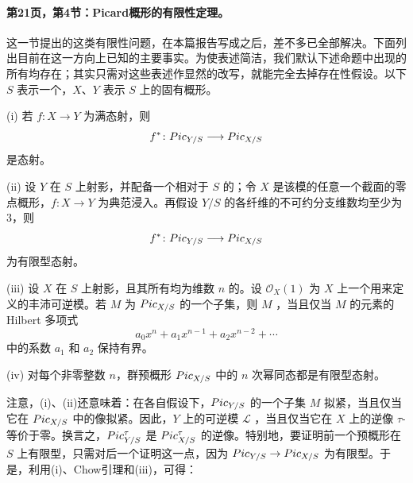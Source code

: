 \paragraph{第21页，第4节：Picard概形的有限性定理。}这一节提出的这类有限性问题，在本篇报告写成之后，差不多已全部解决。下面列出目前在这一方向上已知的主要事实。为使表述简洁，我们默认下述命题中出现的所有均存在；其实只需对这些表述作显然的改写，就能完全去掉存在性假设。以下 $S$ 表示一个，$X$、$Y$ 表示 $S$ 上的固有概形。

\begin{statement}{(i)}
若 $f\colon X\to Y$ 为满态射，则
\[
f^*\colon Pic_{Y/S}\longrightarrow Pic_{X/S}
\]
是态射。
\end{statement}

\begin{statement}{(ii)}
设 $Y$ 在 $S$ 上射影，并配备一个相对于 $S$ 的；令 $X$ 是该模的任意一个截面的零点概形，$f\colon X\to Y$ 为典范浸入。再假设 $Y/S$ 的各纤维的不可约分支维数均至少为 $3$，则
\[
f^*\colon Pic_{Y/S}\longrightarrow Pic_{X/S}
\]
为有限型态射。
\end{statement}

\begin{statement}{(iii)}
设 $X$ 在 $S$ 上射影，且其所有均为维数 $n$ 的。设 $\mathcal O_X(1)$ 为 $X$ 上一个用来定义的丰沛可逆模。若 $M$ 为 $Pic_{X/S}$ 的一个子集，则 $M$ ，当且仅当 $M$ 的元素的 Hilbert 多项式
\[
a_0x^n+a_1x^{n-1}+a_2x^{n-2}+\cdots
\]
中的系数 $a_1$ 和 $a_2$ 保持有界。
\end{statement}

\begin{statement}{(iv)}
对每个非零整数 $n$，群预概形 $Pic_{X/S}$ 中的 $n$ 次幂同态都是有限型态射。
\end{statement}

注意，(i)、(ii)还意味着：在各自假设下，$Pic_{Y/S}$ 的一个子集 $M$ 拟紧，当且仅当它在 $Pic_{X/S}$ 中的像拟紧。因此，$Y$ 上的可逆模 $\mathcal L$ ，当且仅当它在 $X$ 上的逆像 $\tau$-等价于零。换言之，$Pic^\tau_{Y/S}$ 是 $Pic^\tau_{X/S}$ 的逆像。特别地，要证明前一个预概形在 $S$ 上有限型，只需对后一个证明这一点，因为 $Pic_{Y/S}\to Pic_{X/S}$ 为有限型。于是，利用(i)、Chow引理和(iii)，可得：

